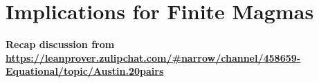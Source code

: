 \section{Implications for Finite Magmas}\label{austin-sec}


{\bf
Recap discussion from \url{https://leanprover.zulipchat.com/#narrow/channel/458659-Equational/topic/Austin.20pairs}
}
